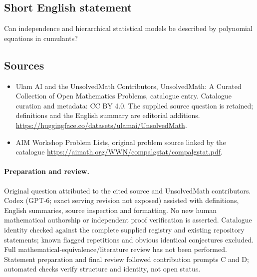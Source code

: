 \documentclass[11pt]{article}
\begin{document}
\subsection{Short English statement}
Can independence and hierarchical statistical models be described by polynomial equations in cumulants?
\subsection{Sources}
\begin{itemize}
\item[\hypertarget{source:statement:1}{S1}] Ulam AI and the UnsolvedMath Contributors, UnsolvedMath: A Curated Collection of Open Mathematics Problems, catalogue entry. Catalogue curation and metadata: CC BY 4.0. The supplied source question is retained; definitions and the English summary are editorial additions.
\url{https://huggingface.co/datasets/ulamai/UnsolvedMath}.
\item[\hypertarget{source:statement:2}{S2}] AIM Workshop Problem Lists, original problem source linked by the catalogue
\url{https://aimath.org/WWN/compalgstat/compalgstat.pdf}.
\end{itemize}
\paragraph{Preparation and review.}
Original question attributed to the cited source and UnsolvedMath contributors. Codex (GPT-6; exact serving revision not exposed) assisted with definitions, English summaries, source inspection and formatting. No new human mathematical authorship or independent proof verification is asserted. Catalogue identity checked against the complete supplied registry and existing repository statements; known flagged repetitions and obvious identical conjectures excluded. Full mathematical-equivalence/literature review has not been performed. Statement preparation and final review followed contribution prompts C and D; automated checks verify structure and identity, not open status.
\label{end:statement}
\end{document}
